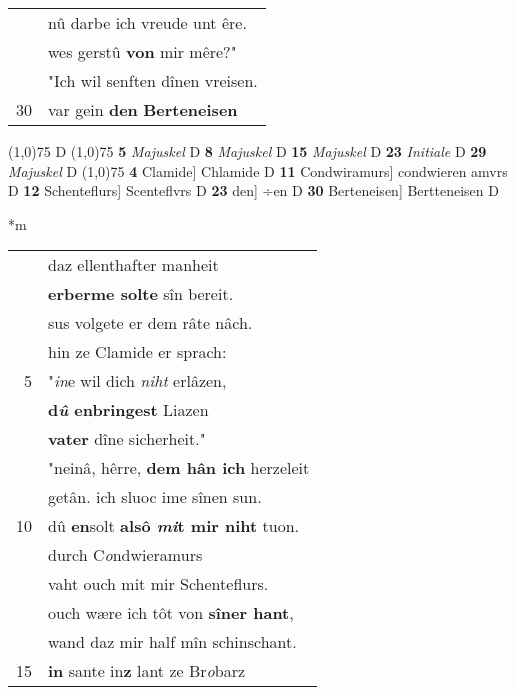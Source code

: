 \documentclass[8pt,a4paper,notitlepage]{article}
\begin{document}
\begin{table}[ht]
\begin{minipage}[t]{0.5\linewidth}
\begin{tabular}{rl}
 & nû darbe ich vreude unt êre.\\ 
 & wes gerstû \textbf{von} mir mêre?"\\ 
 & "Ich wil senften dînen vreisen.\\ 
30 & var gein \textbf{den} \textbf{Berteneisen}\\ 
\end{tabular}
\scriptsize
\line(1,0){75} \newline
D \newline
\line(1,0){75} \newline
\textbf{5} \textit{Majuskel} D  \textbf{8} \textit{Majuskel} D  \textbf{15} \textit{Majuskel} D  \textbf{23} \textit{Initiale} D  \textbf{29} \textit{Majuskel} D  \newline
\line(1,0){75} \newline
\textbf{4} Clamide] Chlamide D \textbf{11} Condwiramurs] condwieren amvrs D \textbf{12} Schenteflurs] Scenteflvrs D \textbf{23} den] ÷en D \textbf{30} Berteneisen] Bertteneisen D \newline
\end{minipage}
\hspace{0.5cm}
\begin{minipage}[t]{0.5\linewidth}
\small
\begin{center}*m
\end{center}
\begin{tabular}{rl}
 & daz ellenthafter manheit\\ 
 & \textbf{erberme solte} sîn bereit.\\ 
 & sus volgete er dem râte nâch.\\ 
 & hin ze Clamide er sprach:\\ 
5 & "\textit{in}e wil dich \textit{niht} erlâzen,\\ 
 & \textbf{d\textit{û} enbringest} Liazen\\ 
 & \textbf{vater} dîne sicherheit."\\ 
 & "neinâ, hêrre, \textbf{dem hân ich} herzeleit\\ 
 & getân. ich sluoc ime sînen sun.\\ 
10 & dû \textbf{en}solt \textbf{alsô \textit{mi}t mir niht} tuon.\\ 
 & durch C\textit{o}ndwieramurs\\ 
 & vaht ouch mit mir Schenteflurs.\\ 
 & ouch wære ich tôt von \textbf{sîner hant},\\ 
 & wand daz mir half mîn schinschant.\\ 
15 & \textbf{in} sante in\textbf{z} lant ze Br\textit{o}barz\\ 

\end{tabular}
\end{minipage}
\end{table}
\end{document}
